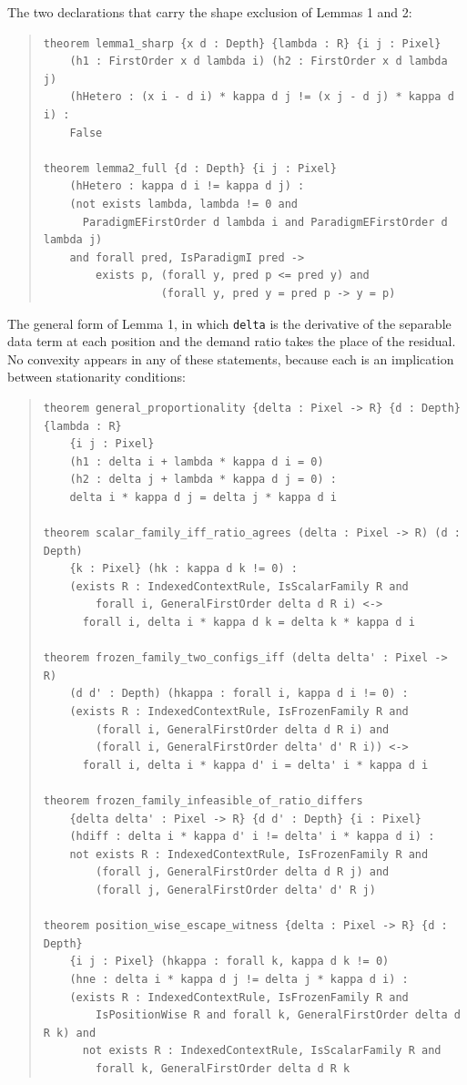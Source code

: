 The two declarations that carry the shape exclusion of Lemmas 1 and 2:

\begin{quote}
\small
\begin{verbatim}
theorem lemma1_sharp {x d : Depth} {lambda : R} {i j : Pixel}
    (h1 : FirstOrder x d lambda i) (h2 : FirstOrder x d lambda j)
    (hHetero : (x i - d i) * kappa d j != (x j - d j) * kappa d i) :
    False

theorem lemma2_full {d : Depth} {i j : Pixel}
    (hHetero : kappa d i != kappa d j) :
    (not exists lambda, lambda != 0 and
      ParadigmEFirstOrder d lambda i and ParadigmEFirstOrder d lambda j)
    and forall pred, IsParadigmI pred ->
        exists p, (forall y, pred p <= pred y) and
                  (forall y, pred y = pred p -> y = p)
\end{verbatim}
\end{quote}

The general form of Lemma 1, in which \texttt{delta} is the derivative of the separable data term at each position and the demand ratio takes the place of the residual. No convexity appears in any of these statements, because each is an implication between stationarity conditions:
\begin{quote}
\small
\begin{verbatim}
theorem general_proportionality {delta : Pixel -> R} {d : Depth} {lambda : R}
    {i j : Pixel}
    (h1 : delta i + lambda * kappa d i = 0)
    (h2 : delta j + lambda * kappa d j = 0) :
    delta i * kappa d j = delta j * kappa d i

theorem scalar_family_iff_ratio_agrees (delta : Pixel -> R) (d : Depth)
    {k : Pixel} (hk : kappa d k != 0) :
    (exists R : IndexedContextRule, IsScalarFamily R and
        forall i, GeneralFirstOrder delta d R i) <->
      forall i, delta i * kappa d k = delta k * kappa d i

theorem frozen_family_two_configs_iff (delta delta' : Pixel -> R)
    (d d' : Depth) (hkappa : forall i, kappa d i != 0) :
    (exists R : IndexedContextRule, IsFrozenFamily R and
        (forall i, GeneralFirstOrder delta d R i) and
        (forall i, GeneralFirstOrder delta' d' R i)) <->
      forall i, delta i * kappa d' i = delta' i * kappa d i

theorem frozen_family_infeasible_of_ratio_differs
    {delta delta' : Pixel -> R} {d d' : Depth} {i : Pixel}
    (hdiff : delta i * kappa d' i != delta' i * kappa d i) :
    not exists R : IndexedContextRule, IsFrozenFamily R and
        (forall j, GeneralFirstOrder delta d R j) and
        (forall j, GeneralFirstOrder delta' d' R j)

theorem position_wise_escape_witness {delta : Pixel -> R} {d : Depth}
    {i j : Pixel} (hkappa : forall k, kappa d k != 0)
    (hne : delta i * kappa d j != delta j * kappa d i) :
    (exists R : IndexedContextRule, IsFrozenFamily R and
        IsPositionWise R and forall k, GeneralFirstOrder delta d R k) and
      not exists R : IndexedContextRule, IsScalarFamily R and
        forall k, GeneralFirstOrder delta d R k
\end{verbatim}
\end{quote}

